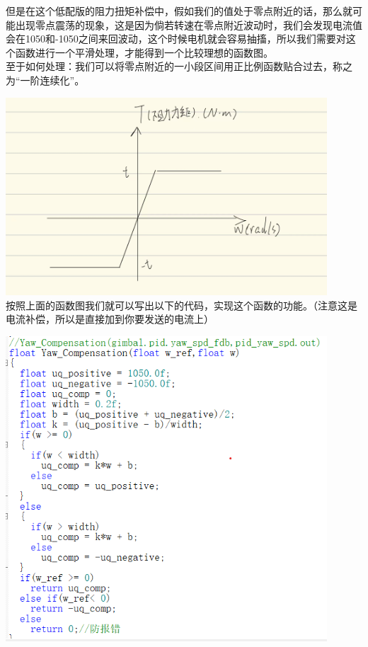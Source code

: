 \documentclass[UTF8,a4paper,12pt]{ctexart}
\begin{document}
        \begin{flushleft}
         但是在这个低配版的阻力扭矩补偿中，假如我们的值处于零点附近的话，那么就可能出现零点震荡的现象，这是因为倘若转速在零点附近波动时，我们会发现电流值会在1050和-1050之间来回波动，这个时候电机就会容易抽搐，所以我们需要对这个函数进行一个平滑处理，才能得到一个比较理想的函数图。\\
         至于如何处理：我们可以将零点附近的一小段区间用正比例函数贴合过去，称之为“一阶连续化”。
         \par \includegraphics[width=12cm]{picture/linearization_yaw.png}\\
         按照上面的函数图我们就可以写出以下的代码，实现这个函数的功能。（注意这是电流补偿，所以是直接加到你要发送的电流上）\\
         \par \includegraphics[width=12cm]{picture/yaw_compensation_code.png}\\
        \end{flushleft}
       
\end{document}

